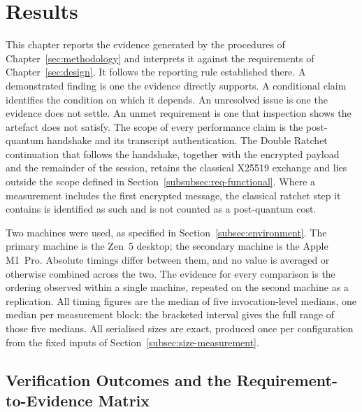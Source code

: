 \section{Results}
\label{sec:results}

This chapter reports the evidence generated by the procedures of Chapter~\ref{sec:methodology} and interprets it against the requirements of Chapter~\ref{sec:design}. It follows the reporting rule established there. A demonstrated finding is one the evidence directly supports. A conditional claim identifies the condition on which it depends. An unresolved issue is one the evidence does not settle. An unmet requirement is one that inspection shows the artefact does not satisfy. The scope of every performance claim is the post-quantum handshake and its transcript authentication. The Double Ratchet continuation that follows the handshake, together with the encrypted payload and the remainder of the session, retains the classical X25519 exchange and lies outside the scope defined in Section~\ref{subsubsec:req-functional}. Where a measurement includes the first encrypted message, the classical ratchet step it contains is identified as such and is not counted as a post-quantum cost.

Two machines were used, as specified in Section~\ref{subsec:environment}. The primary machine is the Zen~5 desktop; the secondary machine is the Apple M1~Pro. Absolute timings differ between them, and no value is averaged or otherwise combined across the two. The evidence for every comparison is the ordering observed within a single machine, repeated on the second machine as a replication. All timing figures are the median of five invocation-level medians, one median per measurement block; the bracketed interval gives the full range of those five medians. All serialised sizes are exact, produced once per configuration from the fixed inputs of Section~\ref{subsec:size-measurement}.

\subsection{Verification Outcomes and the Requirement-to-Evidence Matrix}
\label{subsec:verification-outcomes}

